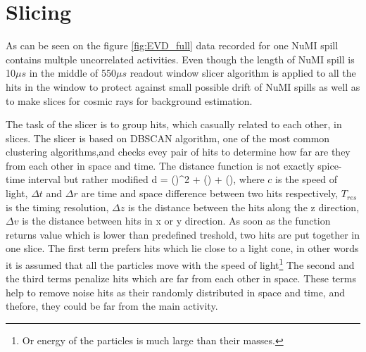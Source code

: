 \section{Slicing}
As can be seen on the figure \ref{fig:EVD_full} data recorded for one NuMI spill contains
multple uncorrelated activities. Even though the length of NuMI spill is 10$\mu s$ in the middle
of 550$\mu s$ readout window slicer algorithm is applied to all the hits in the window to protect 
against small possible drift of NuMI spills as well as to make slices for cosmic rays for background
estimation.

The task of the slicer is to group hits, which casually related to each other, in slices. The slicer 
is based on DBSCAN algorithm, one of the most common clustering algorithms,and checks evey pair of hits 
to determine how far are they from each other in space and time. The distance function is not exactly 
spice-time interval but rather modified 
\be
d = \Big(\Big)^2 + \Big(\Big) + 
\Big(\Big),
\ee 
where $c$ is the speed of light, $\Delta t$ and $\Delta r$ are time and space difference between two 
hits respectively, $T_{res}$ is the timing resolution, $\Delta z$ is the distance between the hits
along the z direction, $\Delta v$ is the distance between hits in x or y direction. As soon as the 
function returns value which is lower than predefined treshold, two hits are put together in one slice.
The first term prefers hits which lie close to a light cone, in other words it is assumed that all
the particles move with the speed of light\footnote{Or energy of the particles is much large than their 
masses.} The second and the third terms penalize hits which are far from each other in space. These
terms help to remove noise hits as their randomly distributed in space and time, and thefore, they 
could be far from the main activity.
